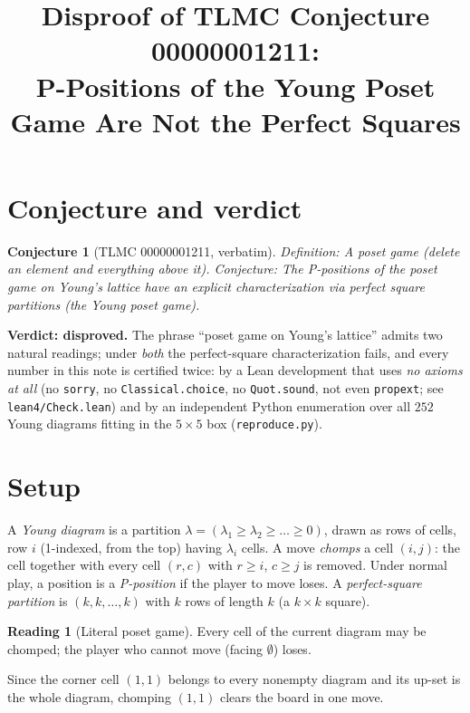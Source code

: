 \documentclass[11pt]{article}
\title{Disproof of TLMC Conjecture 00000001211:\\ P-Positions of the Young Poset Game Are Not the Perfect Squares}
\author{}
\date{}
\newtheorem{conjecture}[theorem]{Conjecture}
\theoremstyle{definition}
\newtheorem{reading}[theorem]{Reading}
\begin{document}
\maketitle

\section*{Conjecture and verdict}

\begin{conjecture}[TLMC 00000001211, verbatim]
Definition: A poset game (delete an element and everything above it). Conjecture: The
P-positions of the poset game on Young's lattice have an explicit characterization via
perfect square partitions (the Young poset game).
\end{conjecture}

\medskip
\noindent\textbf{Verdict: disproved.} The phrase ``poset game on Young's lattice'' admits two
natural readings; under \emph{both} the perfect-square characterization fails, and every number
in this note is certified twice: by a Lean development that uses \emph{no axioms at all} (no
\texttt{sorry}, no \texttt{Classical.choice}, no \texttt{Quot.sound}, not even
\texttt{propext}; see \texttt{lean4/Check.lean}) and by an independent Python enumeration over
all $252$ Young diagrams fitting in the $5\times 5$ box (\texttt{reproduce.py}).

\section*{Setup}

A \emph{Young diagram} is a partition $\lambda=(\lambda_1\ge\lambda_2\ge\dots\ge 0)$, drawn as
rows of cells, row $i$ (1-indexed, from the top) having $\lambda_i$ cells. A move
\emph{chomps} a cell $(i,j)$: the cell together with every cell $(r,c)$ with $r\ge i$, $c\ge j$
is removed. Under normal play, a position is a \emph{P-position} if the player to move loses.
A \emph{perfect-square partition} is $(k,k,\dots,k)$ with $k$ rows of length $k$
(a $k\times k$ square).

\begin{reading}[Literal poset game]
Every cell of the current diagram may be chomped; the player who cannot move (facing $\emptyset$)
loses.
\end{reading}

Since the corner cell $(1,1)$ belongs to every nonempty diagram and its up-set is the whole
diagram, chomping $(1,1)$ clears the board in one move.
\end{document}
